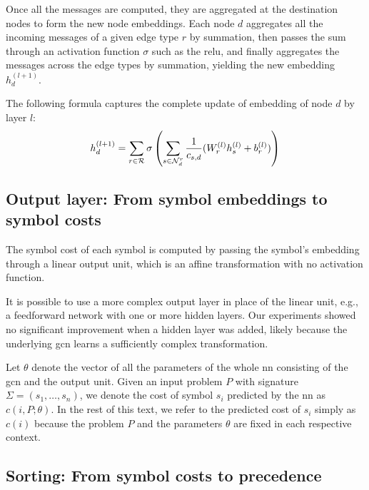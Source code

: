 Once all the messages are computed,
they are aggregated at the destination nodes to form the new node embeddings.
Each node $d$ aggregates all the incoming messages of a given edge type $r$ by summation,
then passes the sum through an activation function $\sigma$ such as the \gls{relu},
and finally aggregates the messages across the edge types by summation,
yielding the new embedding $h_d^{(l+1)}$.

The following formula captures the complete update of embedding of node $d$ by layer $l$:
$$
h_d^{(l+1)} =
\sum_{r \in \mathcal{R}} \sigma \left(\sum_{s \in \mathcal{N}_d^r} \frac{1}{c_{s,d}} (W_r^{(l)} h_s^{(l)} + b_r^{(l)})\right)
$$



\subsection{Output layer: From symbol embeddings to symbol costs}
\label{sec:output}

The symbol cost of each symbol is computed by passing the symbol's embedding through a linear output unit,
which is an affine transformation with no activation function.

It is possible to use a more complex output layer in place of the linear unit,
e.g., a feedforward network with one or more hidden layers.
Our experiments showed no significant improvement when a hidden layer was added,
likely because the underlying \gls{gcn} learns a sufficiently complex transformation.

Let $\theta$ denote the vector of all the parameters of the whole \acrlong{nn} consisting of the \gls{gcn} and the output unit.
Given an input problem $P$ with signature $\Sigma = (s_1, \ldots, s_n)$,
we denote the cost of symbol $s_i$ predicted by the \acrlong{nn} as $c(i, P; \theta)$.
In the rest of this text,
we refer to the predicted cost of $s_i$ simply as $c(i)$
because the problem $P$ and the parameters $\theta$ are fixed in each respective context.

\subsection{Sorting: From symbol costs to precedence}
\label{sec:sorting}

